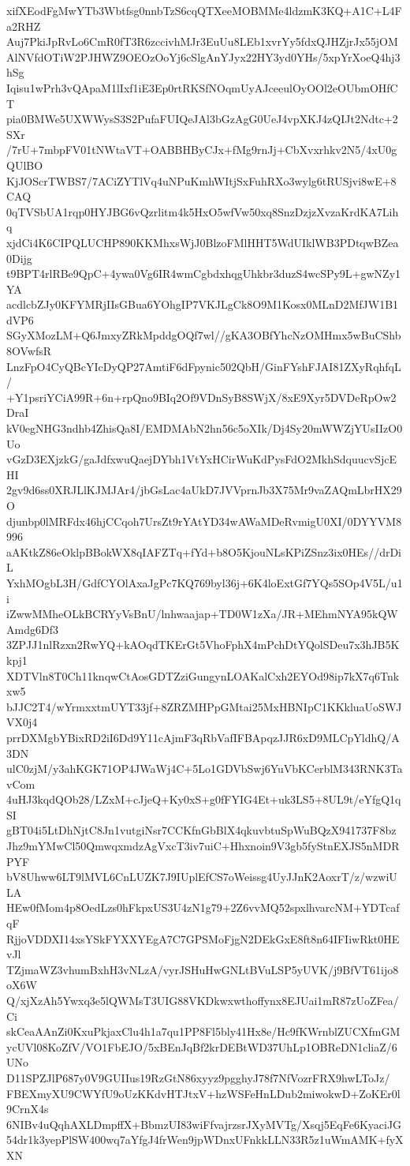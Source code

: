 xifXEodFgMwYTb3Wbtfsg0nnbTzS6cqQTXeeMOBMMe4ldzmK3KQ+A1C+L4Fa2RHZ
Auj7PkiJpRvLo6CmR0fT3R6zccivhMJr3EuUu8LEb1xvrYy5fdxQJHZjrJx55jOM
AlNVfdOTiW2PJHWZ9OEOzOoYj6cSlgAnYJyx22HY3yd0YHs/5xpYrXoeQ4hj3hSg
Iqisu1wPrh3vQApaM1lIxf1iE3Ep0rtRKSfNOqmUyAJceeulOyOOl2eOUbmOHfCT
pia0BMWe5UXWWysS3S2PufaFUIQeJAl3bGzAgG0UeJ4vpXKJ4zQIJt2Ndtc+2SXr
/7rU+7mbpFV01tNWtaVT+OABBHByCJx+fMg9rnJj+CbXvxrhkv2N5/4xU0gQUlBO
KjJOScrTWBS7/7ACiZYTlVq4uNPuKmhWItjSxFuhRXo3wylg6tRUSjvi8wE+8CAQ
0qTVSbUA1rqp0HYJBG6vQzrlitm4k5HxO5wfVw50xq8SnzDzjzXvzaKrdKA7Lihq
xjdCi4K6CIPQLUCHP890KKMhxsWjJ0BlzoFMlHHT5WdUIklWB3PDtqwBZea0Dijg
t9BPT4rlRBe9QpC+4ywa0Vg6IR4wmCgbdxhqgUhkbr3duzS4wcSPy9L+gwNZy1YA
acdlcbZJy0KFYMRjIIsGBua6YOhgIP7VKJLgCk8O9M1Kosx0MLnD2MfJW1B1dVP6
SGyXMozLM+Q6JmxyZRkMpddgOQf7wl//gKA3OBfYhcNzOMHmx5wBuCShb8OVwfsR
LnzFpO4CyQBcYIcDyQP27AmtiF6dFpynic502QbH/GinFYshFJAI81ZXyRqhfqL/
+Y1psriYCiA99R+6n+rpQno9BIq2Of9VDnSyB8SWjX/8xE9Xyr5DVDeRpOw2DraI
kV0egNHG3ndhb4ZhisQa8I/EMDMAbN2hn56c5oXIk/Dj4Sy20mWWZjYUsIIzO0Uo
vGzD3EXjzkG/gaJdfxwuQaejDYbh1VtYxHCirWuKdPysFdO2MkhSdquucvSjcEHI
2gv9d6ss0XRJLlKJMJAr4/jbGsLac4aUkD7JVVprnJb3X75Mr9vaZAQmLbrHX29O
djunbp0lMRFdx46hjCCqoh7UrsZt9rYAtYD34wAWaMDeRvmigU0XI/0DYYVM8996
aAKtkZ86eOklpBBokWX8qIAFZTq+fYd+b8O5KjouNLsKPiZSnz3ix0HEs//drDiL
YxhMOgbL3H/GdfCYOlAxaJgPc7KQ769byl36j+6K4loExtGf7YQs5SOp4V5L/u1i
iZwwMMheOLkBCRYyVsBnU/lnhwaajap+TD0W1zXa/JR+MEhmNYA95kQWAmdg6Df3
3ZPJJ1nlRzxn2RwYQ+kAOqdTKErGt5VhoFphX4mPchDtYQolSDeu7x3hJB5Kkpj1
XDTVln8T0Ch11knqwCtAosGDTZziGungynLOAKalCxh2EYOd98ip7kX7q6Tnkxw5
bJJC2T4/wYrmxxtmUYT33jf+8ZRZMHPpGMtai25MxHBNIpC1KKkluaUoSWJVX0j4
prrDXMgbYBixRD2iI6Dd9Y11cAjmF3qRbVafIFBApqzJJR6xD9MLCpYldhQ/A3DN
ulC0zjM/y3ahKGK71OP4JWaWj4C+5Lo1GDVbSwj6YuVbKCerblM343RNK3TavCom
4uHJ3kqdQOb28/LZxM+cJjeQ+Ky0xS+g0fFYIG4Et+uk3LS5+8UL9t/eYfgQ1qSI
gBT04i5LtDhNjtC8Jn1vutgiNsr7CCKfnGbBlX4qkuvbtuSpWuBQzX941737F8bz
Jhz9mYMwCl50QmwqxmdzAgVxcT3iv7uiC+Hhxnoin9V3gb5fyStnEXJS5nMDRPYF
bV8Uhww6LT9lMVL6CnLUZK7J9IUplEfCS7oWeissg4UyJJnK2AoxrT/z/wzwiULA
HEw0fMom4p8OedLzs0hFkpxUS3U4zN1g79+2Z6vvMQ52spxlhvarcNM+YDTcafqF
RjjoVDDXI14xsYSkFYXXYEgA7C7GPSMoFjgN2DEkGxE8ft8n64IFIiwRkt0HEvJl
TZjmaWZ3vhumBxhH3vNLzA/vyrJSHuHwGNLtBVuLSP5yUVK/j9BfVT61ijo8oX6W
Q/xjXzAh5Ywxq3e5lQWMsT3UIG88VKDkwxwthoffynx8EJUai1mR87zUoZFea/Ci
skCeaAAnZi0KxuPkjaxClu4h1a7qu1PP8Fl5bly41Hx8e/Hc9fKWrnblZUCXfmGM
ycUVl08KoZfV/VO1FbEJO/5xBEnJqBf2krDEBtWD37UhLp1OBReDN1cliaZ/6UNo
D11SPZJlP687y0V9GUIIus19RzGtN86xyyz9pgghyJ78f7NfVozrFRX9hwLToJz/
FBEXmyXU9CWYfU9oUzKKdvHTJtxV+hzWSFeHnLDub2miwokwD+ZoKEr0l9CrnX4s
6NIBv4uQqhAXLDmpffX+BbmzUI83wiFfvajrzsrJXyMVTg/Xsqj5EqFe6KyaciJG
54dr1k3yepPlSW400wq7aYfgJ4frWen9jpWDnxUFnkkLLN33R5z1uWmAMK+fyXXN

